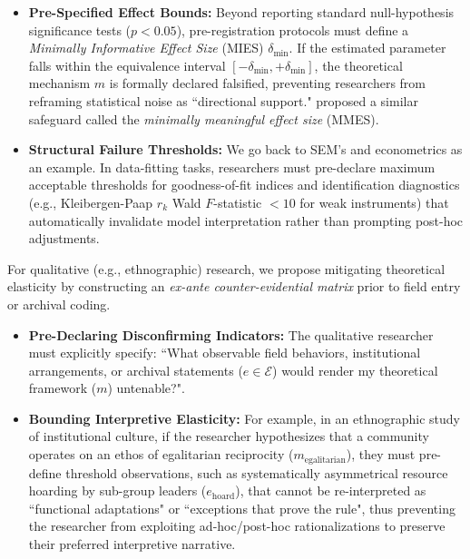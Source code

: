 \documentclass{article}
\theoremstyle{definition}
\begin{document}
\begin{itemize}
    \item \textbf{Pre-Specified Effect Bounds:} Beyond reporting standard null-hypothesis significance tests ($p < 0.05$), pre-registration protocols must define a \textit{Minimally Informative Effect Size} (MIES) $\delta_{\text{min}}$. If the estimated parameter falls within the equivalence interval $[-\delta_{\text{min}}, +\delta_{\text{min}}]$, the theoretical mechanism $m$ is formally declared falsified, preventing researchers from reframing statistical noise as ``directional support." \cite{CBC22} proposed a similar safeguard called the \textit{minimally meaningful effect size} (MMES).

    \item \textbf{Structural Failure Thresholds:} We go back to SEM's and econometrics as an example. In data-fitting tasks, researchers must pre-declare maximum acceptable thresholds for goodness-of-fit indices and identification diagnostics (e.g., Kleibergen-Paap $r_k$ Wald $F$-statistic $< 10$ for weak instruments) that automatically invalidate model interpretation rather than prompting post-hoc adjustments.
\end{itemize}

\noindent
For qualitative (e.g., ethnographic) research, we propose mitigating theoretical elasticity by constructing an \textit{ex-ante counter-evidential matrix} prior to field entry or archival coding.

\begin{itemize}
    \item \textbf{Pre-Declaring Disconfirming Indicators:} The qualitative researcher must explicitly specify: ``What observable field behaviors, institutional arrangements, or archival statements ($e \in \mathcal{E}$) would render my theoretical framework ($m$) untenable?".

    \item \textbf{Bounding Interpretive Elasticity:} For example, in an ethnographic study of institutional culture, if the researcher hypothesizes that a community operates on an ethos of egalitarian reciprocity ($m_{\text{egalitarian}}$), they must pre-define threshold observations, such as systematically asymmetrical resource hoarding by sub-group leaders ($e_{\text{hoard}}$), that cannot be re-interpreted as ``functional adaptations" or ``exceptions that prove the rule", thus preventing the researcher from exploiting ad-hoc/post-hoc rationalizations to preserve their preferred interpretive narrative. 
\end{itemize}
\end{document}

